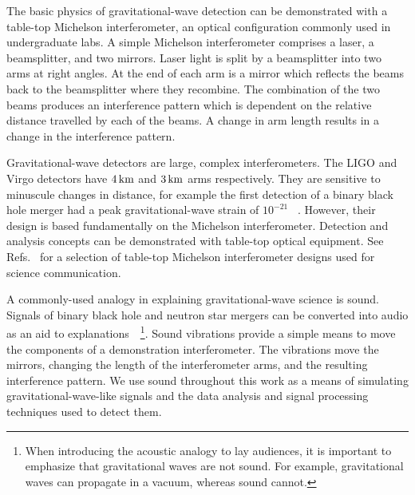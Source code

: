 \documentclass[paper-main.tex]{subfiles}
\begin{document}
The basic physics of gravitational-wave detection can be demonstrated with a table-top Michelson interferometer, an optical configuration commonly used in undergraduate labs. 
A simple Michelson interferometer comprises a laser, a beamsplitter, and two mirrors. 
Laser light is split by a beamsplitter into two arms at right angles. 
At the end of each arm is a mirror which reflects the beams back to the beamsplitter where they recombine. 
The combination of the two beams produces an interference pattern which is dependent on the relative distance travelled by each of the beams. 
A change in arm length results in a change in the interference pattern. 



Gravitational-wave detectors are large, complex interferometers.
The LIGO and Virgo detectors have $4\,{\rm km}$ and $3\,{\rm km}$ arms respectively.
They are sensitive to minuscule changes in distance, for example the first detection of a binary black hole merger had a peak gravitational-wave strain of $10^{-21}$ ~\cite{GW150914}.
However, their design is based fundamentally on the Michelson interferometer. 
Detection and analysis concepts can be demonstrated with table-top optical equipment. 
See Refs.~\cite{TTExhibit:2020,TTExhibit:online,ThorLabsIFO,LIGOIFOGlue,LIGOIFOMagnets,FoxEtAl:1999} for a selection of table-top Michelson interferometer designs used for science communication. 
 

A commonly-used analogy in explaining gravitational-wave science is sound. 
Signals of binary black hole and neutron star mergers can be converted into audio as an aid to explanations~\cite{SoundsOfSpaceTime:online,BlackHoleHunter:online}~\footnote{When introducing the acoustic analogy to lay audiences, it is important to emphasize that gravitational waves are not sound. For example, gravitational waves can propagate in a vacuum, whereas sound cannot.}.
Sound vibrations provide a simple means to move the components of a demonstration interferometer. 
The vibrations move the mirrors, changing the length of the interferometer arms, and the resulting interference pattern. 
We use sound throughout this work as a means of simulating gravitational-wave-like signals and the data analysis and signal processing techniques used to detect them.
\end{document}
